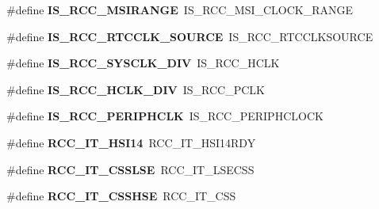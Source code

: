 \begin{DoxyCompactItemize}
\item 
\mbox{\label{group___h_a_l___r_c_c___aliased_gad3f63ae7a859b8f5395aaf703ac72694}} 
\#define {\bfseries I\+S\+\_\+\+R\+C\+C\+\_\+\+M\+S\+I\+R\+A\+N\+GE}~I\+S\+\_\+\+R\+C\+C\+\_\+\+M\+S\+I\+\_\+\+C\+L\+O\+C\+K\+\_\+\+R\+A\+N\+GE
\item 
\mbox{\label{group___h_a_l___r_c_c___aliased_gafbf1d14cdfb90a3da2148a8b398fae50}} 
\#define {\bfseries I\+S\+\_\+\+R\+C\+C\+\_\+\+R\+T\+C\+C\+L\+K\+\_\+\+S\+O\+U\+R\+CE}~I\+S\+\_\+\+R\+C\+C\+\_\+\+R\+T\+C\+C\+L\+K\+S\+O\+U\+R\+CE
\item 
\mbox{\label{group___h_a_l___r_c_c___aliased_ga43366c08676a120c9c7ec17169183054}} 
\#define {\bfseries I\+S\+\_\+\+R\+C\+C\+\_\+\+S\+Y\+S\+C\+L\+K\+\_\+\+D\+IV}~I\+S\+\_\+\+R\+C\+C\+\_\+\+H\+C\+LK
\item 
\mbox{\label{group___h_a_l___r_c_c___aliased_ga10acdfe634bde9d8591127e09c290178}} 
\#define {\bfseries I\+S\+\_\+\+R\+C\+C\+\_\+\+H\+C\+L\+K\+\_\+\+D\+IV}~I\+S\+\_\+\+R\+C\+C\+\_\+\+P\+C\+LK
\item 
\mbox{\label{group___h_a_l___r_c_c___aliased_gad38e6304f89528092a9a24943b955d03}} 
\#define {\bfseries I\+S\+\_\+\+R\+C\+C\+\_\+\+P\+E\+R\+I\+P\+H\+C\+LK}~I\+S\+\_\+\+R\+C\+C\+\_\+\+P\+E\+R\+I\+P\+H\+C\+L\+O\+CK
\item 
\mbox{\label{group___h_a_l___r_c_c___aliased_ga1d2b2eb3fca0475683b879377c952fbf}} 
\#define {\bfseries R\+C\+C\+\_\+\+I\+T\+\_\+\+H\+S\+I14}~R\+C\+C\+\_\+\+I\+T\+\_\+\+H\+S\+I14\+R\+DY
\item 
\mbox{\label{group___h_a_l___r_c_c___aliased_ga2693825b3d6ae5e2202c59e9ff0f84e9}} 
\#define {\bfseries R\+C\+C\+\_\+\+I\+T\+\_\+\+C\+S\+S\+L\+SE}~R\+C\+C\+\_\+\+I\+T\+\_\+\+L\+S\+E\+C\+SS
\item 
\mbox{\label{group___h_a_l___r_c_c___aliased_ga0f173b0e032747b82a9322739f6e3635}} 
\#define {\bfseries R\+C\+C\+\_\+\+I\+T\+\_\+\+C\+S\+S\+H\+SE}~R\+C\+C\+\_\+\+I\+T\+\_\+\+C\+SS

\end{DoxyCompactItemize}

